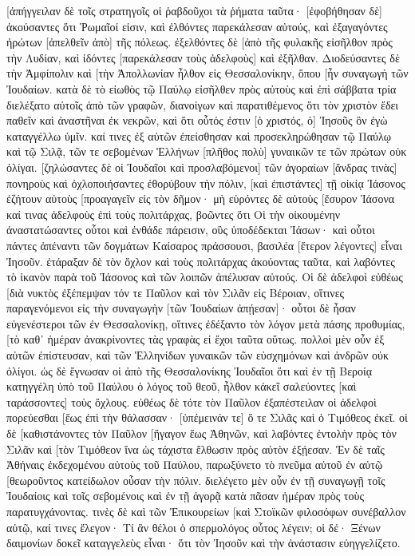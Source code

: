 [ἀπήγγειλαν δὲ τοῖς στρατηγοῖς οἱ ῥαβδοῦχοι τὰ ῥήματα ταῦτα· [ἐφοβήθησαν δὲ] ἀκούσαντες ὅτι Ῥωμαῖοί εἰσιν, 
καὶ ἐλθόντες παρεκάλεσαν αὐτούς, καὶ ἐξαγαγόντες ἠρώτων [ἀπελθεῖν ἀπὸ] τῆς πόλεως. 
ἐξελθόντες δὲ [ἀπὸ τῆς φυλακῆς εἰσῆλθον πρὸς τὴν Λυδίαν, καὶ ἰδόντες [παρεκάλεσαν τοὺς ἀδελφοὺς] καὶ ἐξῆλθαν. 
Διοδεύσαντες δὲ τὴν Ἀμφίπολιν καὶ [τὴν Ἀπολλωνίαν ἦλθον εἰς Θεσσαλονίκην, ὅπου [ἦν συναγωγὴ τῶν Ἰουδαίων. 
κατὰ δὲ τὸ εἰωθὸς τῷ Παύλῳ εἰσῆλθεν πρὸς αὐτοὺς καὶ ἐπὶ σάββατα τρία διελέξατο αὐτοῖς ἀπὸ τῶν γραφῶν, 
διανοίγων καὶ παρατιθέμενος ὅτι τὸν χριστὸν ἔδει παθεῖν καὶ ἀναστῆναι ἐκ νεκρῶν, καὶ ὅτι οὗτός ἐστιν [ὁ χριστός, ὁ] Ἰησοῦς ὃν ἐγὼ καταγγέλλω ὑμῖν. 
καί τινες ἐξ αὐτῶν ἐπείσθησαν καὶ προσεκληρώθησαν τῷ Παύλῳ καὶ τῷ Σιλᾷ, τῶν τε σεβομένων Ἑλλήνων [πλῆθος πολὺ] γυναικῶν τε τῶν πρώτων οὐκ ὀλίγαι. 
[ζηλώσαντες δὲ οἱ Ἰουδαῖοι καὶ προσλαβόμενοι] τῶν ἀγοραίων [ἄνδρας τινὰς] πονηροὺς καὶ ὀχλοποιήσαντες ἐθορύβουν τὴν πόλιν, [καὶ ἐπιστάντες] τῇ οἰκίᾳ Ἰάσονος ἐζήτουν αὐτοὺς [προαγαγεῖν εἰς τὸν δῆμον· 
μὴ εὑρόντες δὲ αὐτοὺς [ἔσυρον Ἰάσονα καί τινας ἀδελφοὺς ἐπὶ τοὺς πολιτάρχας, βοῶντες ὅτι Οἱ τὴν οἰκουμένην ἀναστατώσαντες οὗτοι καὶ ἐνθάδε πάρεισιν, 
οὓς ὑποδέδεκται Ἰάσων· καὶ οὗτοι πάντες ἀπέναντι τῶν δογμάτων Καίσαρος πράσσουσι, βασιλέα [ἕτερον λέγοντες] εἶναι Ἰησοῦν. 
ἐτάραξαν δὲ τὸν ὄχλον καὶ τοὺς πολιτάρχας ἀκούοντας ταῦτα, 
καὶ λαβόντες τὸ ἱκανὸν παρὰ τοῦ Ἰάσονος καὶ τῶν λοιπῶν ἀπέλυσαν αὐτούς. 
Οἱ δὲ ἀδελφοὶ εὐθέως [διὰ νυκτὸς ἐξέπεμψαν τόν τε Παῦλον καὶ τὸν Σιλᾶν εἰς Βέροιαν, οἵτινες παραγενόμενοι εἰς τὴν συναγωγὴν [τῶν Ἰουδαίων ἀπῄεσαν]· 
οὗτοι δὲ ἦσαν εὐγενέστεροι τῶν ἐν Θεσσαλονίκῃ, οἵτινες ἐδέξαντο τὸν λόγον μετὰ πάσης προθυμίας, [τὸ καθ᾽ ἡμέραν ἀνακρίνοντες τὰς γραφὰς εἰ ἔχοι ταῦτα οὕτως. 
πολλοὶ μὲν οὖν ἐξ αὐτῶν ἐπίστευσαν, καὶ τῶν Ἑλληνίδων γυναικῶν τῶν εὐσχημόνων καὶ ἀνδρῶν οὐκ ὀλίγοι. 
ὡς δὲ ἔγνωσαν οἱ ἀπὸ τῆς Θεσσαλονίκης Ἰουδαῖοι ὅτι καὶ ἐν τῇ Βεροίᾳ κατηγγέλη ὑπὸ τοῦ Παύλου ὁ λόγος τοῦ θεοῦ, ἦλθον κἀκεῖ σαλεύοντες [καὶ ταράσσοντες] τοὺς ὄχλους. 
εὐθέως δὲ τότε τὸν Παῦλον ἐξαπέστειλαν οἱ ἀδελφοὶ πορεύεσθαι [ἕως ἐπὶ τὴν θάλασσαν· [ὑπέμεινάν τε] ὅ τε Σιλᾶς καὶ ὁ Τιμόθεος ἐκεῖ. 
οἱ δὲ [καθιστάνοντες τὸν Παῦλον [ἤγαγον ἕως Ἀθηνῶν, καὶ λαβόντες ἐντολὴν πρὸς τὸν Σιλᾶν καὶ [τὸν Τιμόθεον ἵνα ὡς τάχιστα ἔλθωσιν πρὸς αὐτὸν ἐξῄεσαν. 
Ἐν δὲ ταῖς Ἀθήναις ἐκδεχομένου αὐτοὺς τοῦ Παύλου, παρωξύνετο τὸ πνεῦμα αὐτοῦ ἐν αὐτῷ [θεωροῦντος κατείδωλον οὖσαν τὴν πόλιν. 
διελέγετο μὲν οὖν ἐν τῇ συναγωγῇ τοῖς Ἰουδαίοις καὶ τοῖς σεβομένοις καὶ ἐν τῇ ἀγορᾷ κατὰ πᾶσαν ἡμέραν πρὸς τοὺς παρατυγχάνοντας. 
τινὲς δὲ καὶ τῶν Ἐπικουρείων [καὶ Στοϊκῶν φιλοσόφων συνέβαλλον αὐτῷ, καί τινες ἔλεγον· Τί ἂν θέλοι ὁ σπερμολόγος οὗτος λέγειν; οἱ δέ· Ξένων δαιμονίων δοκεῖ καταγγελεὺς εἶναι· ὅτι τὸν Ἰησοῦν καὶ τὴν ἀνάστασιν εὐηγγελίζετο. 
